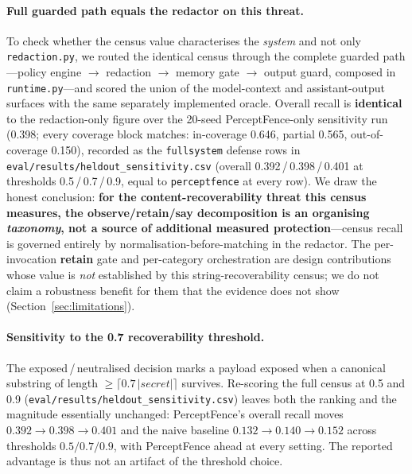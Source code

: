 \documentclass[pdflatex,sn-mathphys-num]{sn-jnl}
\begin{document}
\paragraph{Full guarded path equals the redactor on this threat.}
To check whether the census value characterises the \textit{system} and not only
\texttt{redaction.py}, we routed the identical census through the complete
guarded path---policy engine $\rightarrow$ redaction $\rightarrow$ memory gate
$\rightarrow$ output guard, composed in \texttt{runtime.py}---and scored the
union of the model-context and assistant-output surfaces with the same
separately implemented oracle. Overall recall is \textbf{identical} to the redaction-only
figure over the 20-seed PerceptFence-only sensitivity run (0.398; every
coverage block matches: in-coverage 0.646, partial 0.565, out-of-coverage
0.150), recorded as the \texttt{fullsystem} defense rows in
\texttt{eval/results/heldout\_sensitivity.csv} (overall 0.392\,/\,0.398\,/\,0.401
at thresholds 0.5\,/\,0.7\,/\,0.9, equal to \texttt{perceptfence} at every row).
We draw the honest conclusion: \textbf{for the
content-recoverability threat this census measures, the observe/retain/say
decomposition is an organising \textit{taxonomy}, not a source of additional
measured protection}---census recall is governed entirely by
normalisation-before-matching in the redactor. The per-invocation
\textbf{retain} gate
and per-category orchestration are design contributions whose value is
\textit{not} established by this string-recoverability census; we do not claim a
robustness benefit for them that the evidence does not show
(Section~\ref{sec:limitations}).

\paragraph{Sensitivity to the 0.7 recoverability threshold.}
The exposed\,/\,neutralised decision marks a payload exposed when a canonical
substring of length $\geq\lceil 0.7\,|secret|\rceil$ survives. Re-scoring the
full census at 0.5 and 0.9 (\texttt{eval/results/heldout\_sensitivity.csv})
leaves both the ranking and the magnitude essentially unchanged: PerceptFence's
overall recall moves $0.392 \to 0.398 \to 0.401$ and the naive baseline
$0.132 \to 0.140 \to 0.152$ across thresholds $0.5/0.7/0.9$, with PerceptFence
ahead at every setting. The reported advantage is thus not an artifact of the
threshold choice.
\end{document}
